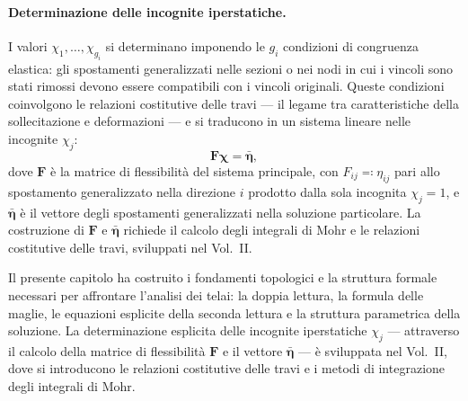 \paragraph{Determinazione delle incognite iperstatiche.}
I valori $\chi_1, \ldots, \chi_{g_i}$ si determinano 
imponendo le $g_i$ condizioni di congruenza elastica: 
gli spostamenti generalizzati nelle sezioni o nei 
nodi in cui i vincoli sono stati rimossi devono 
essere compatibili con i vincoli originali. Queste 
condizioni coinvolgono le relazioni costitutive 
delle travi --- il legame tra caratteristiche della 
sollecitazione e deformazioni --- e si traducono 
in un sistema lineare nelle incognite $\chi_j$:
\begin{equation}\label{eq:sistema_iperstatico_telaio}
	\bm{F}\bm{\chi} = \bar{\bm{\eta}},
\end{equation}
dove $\bm{F}$ è la matrice di flessibilità del 
sistema principale, con $F_{ij}\eqqcolon \eta_{ij}$ pari allo 
spostamento generalizzato nella direzione $i$ 
prodotto dalla sola incognita $\chi_j = 1$, e 
$\bar{\bm{\eta}}$ è il vettore degli spostamenti 
generalizzati nella soluzione particolare.
La costruzione di $\bm{F}$ e $\bar{\bm{\eta}}$ richiede 
il calcolo degli integrali di Mohr e le relazioni 
costitutive delle travi, sviluppati nel Vol.~II.


\begin{oss}
	Il presente capitolo ha costruito i fondamenti 
	topologici e la struttura formale necessari per 
	affrontare l'analisi dei telai: la doppia lettura, 
	la formula delle maglie, le equazioni esplicite 
	della seconda lettura e la struttura parametrica 
	della soluzione. La determinazione esplicita delle 
	incognite iperstatiche $\chi_j$ --- attraverso 
	il calcolo della matrice di flessibilità 
	$\bm{F}$ e il vettore $\bar{\bm{\eta}}$ --- è sviluppata 
	nel Vol.~II, dove si introducono le relazioni 
	costitutive delle travi e i metodi di integrazione 
	degli integrali di Mohr.
\end{oss}




